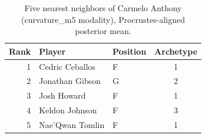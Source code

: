 \begin{table}[htbp]
  \centering\small
  \begin{tabular}{rllc}
    \toprule
    Rank & Player & Position & Archetype \\
    \midrule
    1 & Cedric Ceballos & F & 1 \\
    2 & Jonathan Gibson & G & 2 \\
    3 & Josh Howard & F & 1 \\
    4 & Keldon Johnson & F & 3 \\
    5 & Nae'Qwan Tomlin & F & 1 \\
    \bottomrule
  \end{tabular}
  \caption{Five nearest neighbors of Carmelo Anthony (curvature_m5 modality), Procrustes-aligned posterior mean.}
  \label{tab:Carmelo_Anthony_neighbors_curvature_m5}
\end{table}

